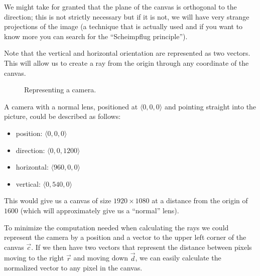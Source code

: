 \documentclass[a4paper,11pt]{article}
\begin{document}
We might take for granted that the plane of the canvas is orthogonal to
the direction; this is not strictly necessary but if it is not, we will
have very strange projections of the image (a technique that is
actually used and if you want to know more you can search for the
``Scheimpflug principle'').

Note that the vertical and horizontal orientation are represented as
two vectors. This will allow us to create a ray from the origin through
any coordinate of the canvas. 

\begin{figure}[h!]
\begin{center}
\caption{Representing a camera.}
\label{fig:camera}
\end{center}
\end{figure}

A camera with a normal lens, positioned at $\langle 0,0,0\rangle$
and pointing straight into the picture, could be described as follows:

\begin{itemize}
 \item position: $\langle 0,0,0\rangle$
 \item direction: $\langle 0,0,1200\rangle$
 \item horizontal: $\langle 960,0,0\rangle$
 \item vertical: $\langle 0,540,0\rangle$
\end{itemize}

This would give us a canvas of size $1920 \times 1080$ at a distance
from the origin of $1600$ (which will approximately give us a
``normal'' lens).

To minimize the computation needed when calculating the rays we could
represent the camera by a position and a vector to the upper left
corner of the canvas $\vec{c}$. If we then have two vectors that represent the
distance between pixels moving to the right $\vec{r}$ and moving down $\vec{d}$, we can
easily calculate the normalized vector to any pixel in the canvas.
\end{document}
